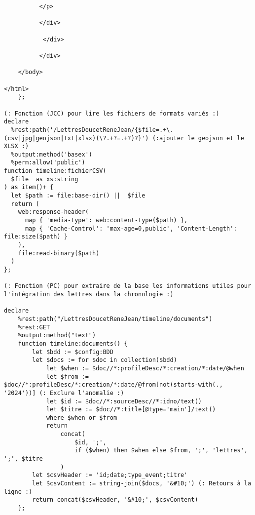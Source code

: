 \begin{verbatim}
          </p>
          
          </div>

           </div>

          </div>
          
    </body>

</html>
    };

(: Fonction (JCC) pour lire les fichiers de formats variés :)
declare
  %rest:path('/LettresDoucetReneJean/{$file=.+\.(csv|jpg|geojson|txt|xlsx)(\?.+?=.+?)?}') (:ajouter le geojson et le XLSX :)
  %output:method('basex')
  %perm:allow('public')
function timeline:fichierCSV(
  $file  as xs:string
) as item()+ {
  let $path := file:base-dir() ||  $file
  return (
    web:response-header(
      map { 'media-type': web:content-type($path) },
      map { 'Cache-Control': 'max-age=0,public', 'Content-Length': file:size($path) }
    ),
    file:read-binary($path)
  )
};  

(: Fonction (PC) pour extraire de la base les informations utiles pour l'intégration des lettres dans la chronologie :)

declare
    %rest:path("/LettresDoucetReneJean/timeline/documents")
    %rest:GET
    %output:method("text")
    function timeline:documents() {
        let $bdd := $config:BDD
        let $docs := for $doc in collection($bdd)
            let $when := $doc//*:profileDesc/*:creation/*:date/@when
            let $from := $doc//*:profileDesc/*:creation/*:date/@from[not(starts-with(., '2024'))] (: Exclure l'anomalie :)
            let $id := $doc//*:sourceDesc//*:idno/text()
            let $titre := $doc//*:title[@type='main']/text()
            where $when or $from
            return
                concat(
                    $id, ';', 
                    if ($when) then $when else $from, ';', 'lettres', ';', $titre
                )
        let $csvHeader := 'id;date;type_event;titre'
        let $csvContent := string-join($docs, '&#10;') (: Retours à la ligne :)
        return concat($csvHeader, '&#10;', $csvContent)
    };
\end{verbatim}